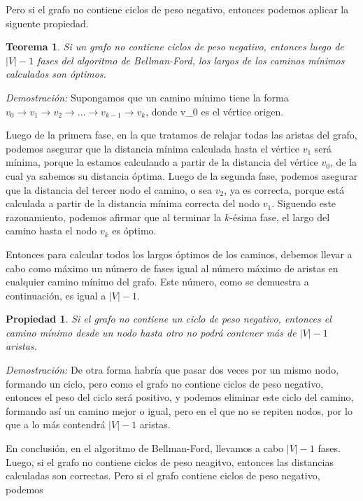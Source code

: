 \documentclass[a4paper, 10pt]{article}
\newcounter{theoremCounter}
\numberwithin{theoremCounter}{subsection}
\numberwithin{problemCounter}{subsection}
\numberwithin{defCounter}{subsection}
\numberwithin{obsCounter}{subsection}
\numberwithin{methCounter}{subsection}
\numberwithin{exampleCounter}{subsection}
\newcounter{propCounter}
\numberwithin{propCounter}{subsection}
\theoremstyle{violetnumbox}
\newtheorem{theoremeT}[theoremCounter]{Teorema}
\theoremstyle{blacknumex}
\newtheorem{propertyT}[propCounter]{Propiedad}
\newenvironment{theorem}{\begin{tBox}\begin{theoremeT}}{\end{theoremeT}\end{tBox}}
\newenvironment{property}{\begin{dBox}\begin{propertyT}}{\end{propertyT}\end{dBox}}
\begin{document}
\begin{multicols}{2}
    Pero si el grafo no contiene ciclos de peso negativo, entonces podemos aplicar la siguente propiedad.

    \begin{theorem}
        Si un grafo no contiene ciclos de peso negativo, entonces luego de $|V|-1$ fases del algoritmo de Bellman-Ford, los largos de los caminos m\'inimos calculados son \'optimos.
    \end{theorem}

    \textit{Demostraci\'on:} Supongamos que un camino m\'inimo tiene la forma $v_0 \rightarrow v_1 \rightarrow v_2 \rightarrow \ldots \rightarrow v_{k-1} \rightarrow v_k$, donde v_0 es el v\'ertice origen.

    Luego de la primera fase, en la que tratamos de relajar todas las aristas del grafo, podemos asegurar que la distancia m\'inima calculada hasta el v\'ertice $v_1$ ser\'a m\'inima, porque la estamos calculando a partir de la distancia del v\'ertice $v_0$, de la cual ya sabemos su distancia \'optima. Luego de la segunda fase, podemos asegurar que la distancia del tercer nodo el camino, o sea $v_2$, ya es correcta, porque est\'a calculada a partir de la distancia m\'inima correcta del nodo $v_1$. Siguendo este razonamiento, podemos afirmar que al terminar la $k$-\'esima fase, el largo del camino hasta el nodo $v_k$ es \'optimo.

    Entonces para calcular todos los largos \'optimos de los caminos, debemos llevar a cabo como m\'aximo un n\'umero de fases igual al n\'umero m\'aximo de aristas en cualquier camino m\'inimo del grafo. Este n\'umero, como se demuestra a continuaci\'on, es igual a $|V| - 1$. \blacksquare

    \begin{property}
        Si el grafo no contiene un ciclo de peso negativo, entonces el camino m\'inimo desde un nodo hasta otro no podr\'a contener m\'as de $|V|-1$ aristas.
    \end{property}
    \textit{Demostraci\'on:} De otra forma habr\'ia que pasar dos veces por un mismo nodo, formando un ciclo, pero como el grafo no contiene ciclos de peso negativo, entonces el peso del ciclo ser\'a positivo, y podemos eliminar este ciclo del camino, formando as\'i un camino mejor o igual, pero en el que no se repiten nodos, por lo que a lo m\'as contendr\'a $|V|-1$ aristas. \blacksquare

    En conclusi\'on, en el algoritmo de Bellman-Ford, llevamos a cabo $|V|-1$ fases. Luego, si el grafo no contiene ciclos de peso neagitvo, entonces las distancias calculadas son correctas. Pero si el grafo contiene ciclos de peso negativo, podemos


\end{multicols}
\end{document}
